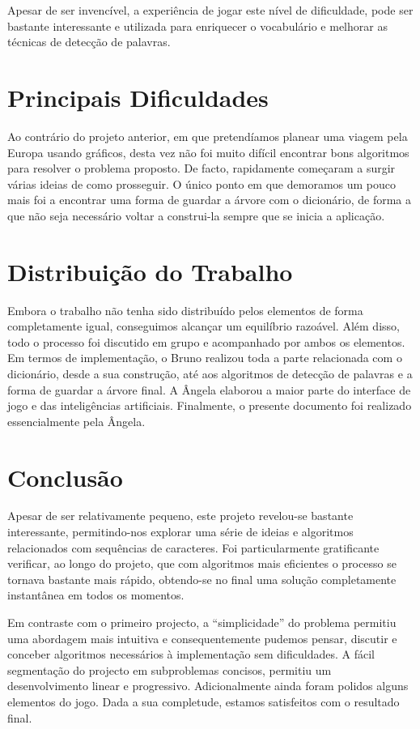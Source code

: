 \documentclass[12pt,a4paper,reqno]{report}
\numberwithin{equation}{section}
\begin{document}
Apesar de ser invencível, a experiência de jogar este nível de dificuldade, pode ser bastante interessante e utilizada para enriquecer o vocabulário e melhorar as técnicas de detecção de palavras.

\chapter{Principais Dificuldades}

Ao contrário do projeto anterior, em que pretendíamos planear uma viagem pela Europa usando gráficos, desta vez não foi muito difícil encontrar bons algoritmos para resolver o problema proposto. De facto, rapidamente começaram a surgir várias ideias de como prosseguir. O único ponto em que demoramos um pouco mais foi a encontrar uma forma de guardar a árvore com o dicionário, de forma a que não seja necessário voltar a construi-la sempre que se inicia a aplicação.

\chapter{Distribuição do Trabalho}

Embora o trabalho não tenha sido distribuído pelos elementos de forma completamente igual, conseguimos alcançar um equilíbrio razoável. Além disso, todo o processo foi discutido em grupo e acompanhado por ambos os elementos. Em termos de implementação, o Bruno realizou toda a parte relacionada com o dicionário, desde a sua construção, até aos algoritmos de detecção de palavras e a forma de guardar a árvore final. A Ângela elaborou a maior parte do interface de jogo e das inteligências artificiais. Finalmente, o presente documento foi realizado essencialmente pela Ângela.

\chapter{Conclusão}

Apesar de ser relativamente pequeno, este projeto revelou-se bastante interessante, permitindo-nos explorar uma série de ideias e algoritmos relacionados com sequências de caracteres. Foi particularmente gratificante verificar, ao longo do projeto, que com algoritmos mais eficientes o processo se tornava bastante mais rápido, obtendo-se no final uma solução completamente instantânea em todos os momentos.

Em contraste com o primeiro projecto, a ``simplicidade'' do problema permitiu uma abordagem mais intuitiva e consequentemente pudemos pensar, discutir e conceber algoritmos necessários à implementação sem dificuldades. A fácil segmentação do projecto em subproblemas concisos, permitiu um desenvolvimento linear e progressivo. Adicionalmente ainda foram polidos alguns elementos do jogo. Dada a sua completude, estamos satisfeitos com o resultado final.
\end{document}
